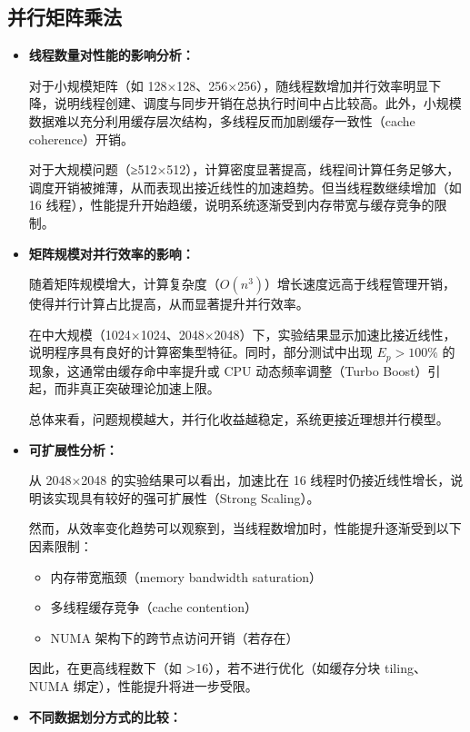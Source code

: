 \documentclass{SYSUReport}
\begin{document}
\subsection{并行矩阵乘法}
\begin{itemize}
\item \textbf{线程数量对性能的影响分析：}

    对于小规模矩阵（如 128×128、256×256），随线程数增加并行效率明显下降，说明线程创建、调度与同步开销在总执行时间中占比较高。此外，小规模数据难以充分利用缓存层次结构，多线程反而加剧缓存一致性（cache coherence）开销。

    对于大规模问题（≥512×512），计算密度显著提高，线程间计算任务足够大，调度开销被摊薄，从而表现出接近线性的加速趋势。但当线程数继续增加（如 16 线程），性能提升开始趋缓，说明系统逐渐受到内存带宽与缓存竞争的限制。

\item \textbf{矩阵规模对并行效率的影响：}

    随着矩阵规模增大，计算复杂度（$O(n^3)$）增长速度远高于线程管理开销，使得并行计算占比提高，从而显著提升并行效率。

    在中大规模（1024×1024、2048×2048）下，实验结果显示加速比接近线性，说明程序具有良好的计算密集型特征。同时，部分测试中出现 $E_p > 100\%$ 的现象，这通常由缓存命中率提升或 CPU 动态频率调整（Turbo Boost）引起，而非真正突破理论加速上限。

    总体来看，问题规模越大，并行化收益越稳定，系统更接近理想并行模型。

\item \textbf{可扩展性分析：}

    从 2048×2048 的实验结果可以看出，加速比在 16 线程时仍接近线性增长，说明该实现具有较好的强可扩展性（Strong Scaling）。

    然而，从效率变化趋势可以观察到，当线程数增加时，性能提升逐渐受到以下因素限制：
    \begin{itemize}
        \item 内存带宽瓶颈（memory bandwidth saturation）
        \item 多线程缓存竞争（cache contention）
        \item NUMA 架构下的跨节点访问开销（若存在）
    \end{itemize}

    因此，在更高线程数下（如 >16），若不进行优化（如缓存分块 tiling、NUMA 绑定），性能提升将进一步受限。

\item \textbf{不同数据划分方式的比较：}


\end{itemize}
\end{document}

